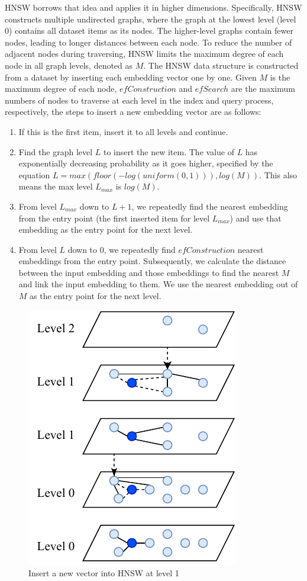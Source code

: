 HNSW borrows that idea and applies it in higher dimensions. Specifically, HNSW constructs multiple undirected graphs, where the graph at the lowest level (level 0) contains all dataset items as its nodes. The higher-level graphs contain fewer nodes, leading to longer distances between each node. To reduce the number of adjacent nodes during traversing, HNSW limits the maximum degree of each node in all graph levels, denoted as $M$. The HNSW data structure is constructed from a dataset by inserting each embedding vector one by one. Given $M$ is the maximum degree of each node, $efConstruction$ and $efSearch$ are the maximum numbers of nodes to traverse at each level in the index and query process, respectively, the steps to insert a new embedding vector are as follows:
\begin{enumerate}
    \item If this is the first item, insert it to all levels and continue.
    \item Find the graph level $L$ to insert the new item. The value of $L$ has exponentially decreasing probability as it goes higher, specified by the equation $L = max(floor(-log(uniform(0, 1))), log(M))$. This also means the max level $L_{max}$ is $log(M)$.
    \item From level $L_{max}$ down to $L + 1$, we repeatedly find the nearest embedding from the entry point (the first inserted item for level $L_{max}$) and use that embedding as the entry point for the next level.
    \item From level $L$ down to $0$, we repeatedly find $efConstruction$ nearest embeddings from the entry point. Subsequently, we calculate the distance between the input embedding and those embeddings to find the nearest $M$ and link the input embedding to them. We use the nearest embedding out of $M$ as the entry point for the next level.
\end{enumerate}

\begin{figure}[th!]
    \centering
    \includegraphics[width=0.5\linewidth]{content/resources/images/fashion-recommendation/chapter4-hnsw-create.pdf}
    \caption{Insert a new vector into HNSW at level 1}
    \label{fig:chapter4-hnsw-create}
\end{figure}

